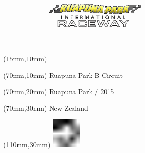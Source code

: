 \null\newpage
\begin{textblock*}{50mm}(15mm,10mm)%
\includegraphics[width=50mm]{LG/RUA.png}
\end{textblock*}
\begin{textblock*}{130mm}(70mm,10mm)%
{\fontsize{20}{20}\selectfont Ruapuna Park B Circuit}\\
\end{textblock*}
\begin{textblock*}{120mm}(70mm,20mm)%
{\fontsize{16}{16}\selectfont Ruapuna Park / 2015}\\
\end{textblock*}
\begin{textblock*}{120mm}(70mm,30mm)%
{\fontsize{12}{12}\selectfont New Zealand}
\end{textblock*}
\begin{textblock*}{30mm}(110mm,30mm)%
\centering
\includegraphics[height=15mm]{icons/fa-rotate-left.pdf}
\end{textblock*}
